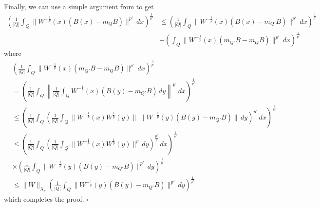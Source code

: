 \documentclass[12pt,reqno ]{amsart}
\numberwithin{equation}{section}
\theoremstyle{definition}
\begin{document}
   Finally, we can use a simple argument from \cite{IM} to get \begin{align*}   \left(\frac{1}{|Q|} \int_{Q} \|  W^{-\frac{1}{p}} (x) (B(x) - m_{Q} B ) \| ^{p'} \, dx \right) ^{\frac{1}{p'}} & \leq  \left(\frac{1}{|Q|} \int_{Q} \|  W^{-\frac{1}{p}} (x) (B(x) - m_{Q'} B ) \| ^{p'} \, dx \right) ^{\frac{1}{p'}}  \\ & +  \left(\int_{Q} \|  W^{-\frac{1}{p}} (x) (m_{Q'} B - m_{Q} B ) \| ^{p'} \, dx \right) ^{\frac{1}{p'}}\end{align*}  where \begin{align*} & \left(\frac{1}{|Q|}\int_{Q} \|  W^{-\frac{1}{p}} (x) (m_{Q'} B - m_{Q} B ) \| ^{p'} \, dx \right) ^{\frac{1}{p'}} \\ & =  \left(\frac{1}{|Q|} \int_{Q} \left\| \frac{1}{|Q|} \int_{Q}  W^{-\frac{1}{p}} (x)  ( B(y) - m_{Q'} B )  \, dy \right\| ^{p'} \, dx \right) ^\frac{1}{p'} \\ & \leq \left(\frac{1}{|Q|} \int_{Q} \left( \frac{1}{|Q|} \int_{Q} \| W^{-\frac{1}{p}} (x) W^{\frac{1}{p}} (y)\| \, \|  W^{-\frac{1}{p}} (y) ( B(y) - m_{Q'} B ) \|  \, dy \right) ^{p'} \, dx \right) ^\frac{1}{p'}     \\ & \leq \left(\frac{1}{|Q|} \int_{Q} \left(\frac{1}{|Q|} \int_{Q}  \| W^{-\frac{1}{p}} (x) W^{\frac{1}{p}} (y) \|^{p} \, dy \right)^\frac{p'}{p} \, dx \right)^\frac{1}{p'}  \\ & \times  \left(\frac{1}{|Q|} \int_Q  \| W^{-\frac{1}{p}}(y)(B(y) - m_{Q'} B ) \|^{p'} \, dy \right) ^\frac{1}{p'} \\ & \leq \|W\|_{\text{A}_p}  \left(\frac{1}{|Q|} \int_Q  \| W^{-\frac{1}{p}}(y)(B(y) - m_{Q'} B )  \|^{p'} \, dy \right) ^\frac{1}{p'} \end{align*}  which completes the proof. \hfill $\square$
\end{document}
